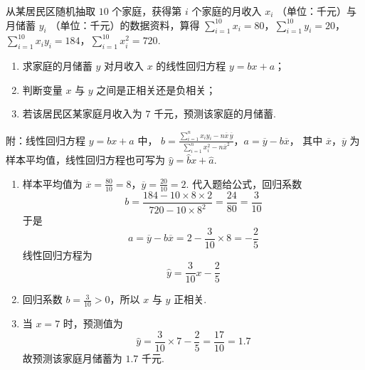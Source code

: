 \begin{problem}
从某居民区随机抽取 \(10\text{ 个}\)家庭，获得第 \(i\) 个家庭的月收入 \(x_{i}\) （单位：\(\text{千元}\)）与月储蓄 \(y_{i}\) （单位：\(\text{千元}\)）的数据资料，算得 \(\sum_{i=1}^{10} x_{i} = 80\)，\(\sum_{i=1}^{10} y_{i} = 20\)，\(\sum_{i=1}^{10} x_{i}y_{i} = 184\)，\(\sum_{i=1}^{10} x_{i}^{2} = 720\).
\begin{enumerate}
\item 求家庭的月储蓄 \(y\) 对月收入 \(x\) 的线性回归方程 \(y = bx + a\)；
\item 判断变量 \(x\) 与 \(y\) 之间是正相关还是负相关；
\item 若该居民区某家庭月收入为 \(7\text{ 千元}\)，预测该家庭的月储蓄.
\end{enumerate}
附：线性回归方程 \(y = bx + a\) 中， \(b = \frac{\sum_{i=1}^{n} x_{i}y_{i} - n\overline{x}\,\overline{y}}{\sum_{i=1}^{n} x_{i}^{2} - n\overline{x}^{2}}\)，\(a = \overline{y} - b\overline{x}\)，
其中 \(\overline{x}\)，\(\overline{y}\) 为样本平均值，线性回归方程也可写为 \(\hat{y} = \hat{b}x + \hat{a}\).
\begin{solution}
\begin{enumerate}
\item 样本平均值为
\(\overline{x}=\frac{80}{10}=8\)，\(\overline{y}=\frac{20}{10}=2\).
代入题给公式，回归系数
\[
b=\frac{184-10\times8\times2}{720-10\times8^2}
=\frac{24}{80}=\frac3{10}
\]
于是
\[
a=\overline y-b\overline x=2-\frac3{10}\times8=-\frac25
\]
线性回归方程为
\[
\hat y=\frac3{10}x-\frac25
\]
\item 回归系数 \(b=\frac3{10}>0\)，所以 \(x\) 与 \(y\) 正相关.
\item 当 \(x=7\) 时，预测值为
\[
\hat y=\frac3{10}\times7-\frac25=\frac{17}{10}=1.7
\]
故预测该家庭月储蓄为 \(1.7\) 千元.
\end{enumerate}
\end{solution}
\end{problem}


